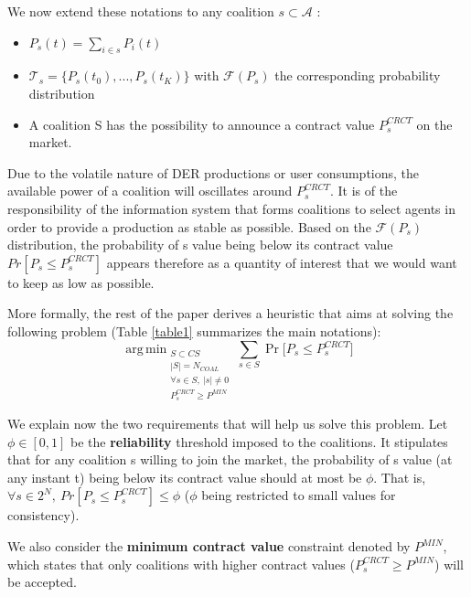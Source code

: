 \documentclass[conference]{IEEEtran}
\DeclareMathOperator*{\argmin}{arg\,min}
\begin{document}
We now extend these notations to any coalition $ s \subset \mathcal{A} $ : 
\begin{itemize}
\item $ P_{s}(t) = \sum_{i \in s} P_{i}(t) $
\item $ \mathcal{T}_{s} = \{ P_{s}(t_{0}),...,P_{s}(t_{K}) \} $ with $ \mathcal{F}(P_{s}) $ the corresponding probability distribution
\item A coalition S has the possibility to announce a contract value $ P_{s}^{CRCT} $ on the market.
\end{itemize}

Due to the volatile nature of DER productions or user consumptions, the available power of a coalition will oscillates around $ P_{s}^{CRCT} $. It is of the responsibility of the information system that forms coalitions to select agents in order to provide a production as stable as possible. Based on the $ \mathcal{F}(P_{s}) $ distribution, the probability of s value being below its contract value $ Pr[P_{s} \leq P_{s}^{CRCT} ] $ appears therefore as a quantity of interest that we would want to keep as low as possible. 

More formally, the rest of the paper derives a heuristic that aims at solving the following problem (Table \ref{table1} summarizes the main notations):
 \begin{equation}
  \argmin _{\substack{ S \subset CS \\ 
                      |S| = N_{COAL} \\ 
                      \forall s \in S,\ |s| \neq 0 
                      \\ P_{s}^{CRCT} \geq P^{MIN}}}
   \sum_{s \in S}  \Pr \bigl[ P_{s} \leq P_{s}^{CRCT} \bigr]
  \label{problem}
\end{equation}  

We explain now the two requirements that will help us solve this problem. Let $ \phi \in [0,1] $ be the \textbf{reliability} threshold imposed to the coalitions. It stipulates that for any coalition s willing to join the market, the probability of s value (at any instant t) being below its contract value should at most be $ \phi $. That is, $ \forall s \in 2^{N},\ Pr[P_{s} \leq P_{s}^{CRCT} ] \leq \phi $ ($ \phi $ being restricted to small values for consistency).

We also consider the \textbf{minimum contract value} constraint denoted by $ P^{MIN} $, which states that only coalitions with higher contract values ($ P_{s}^{CRCT} \geq P^{MIN} $) will be accepted.
\end{document}
